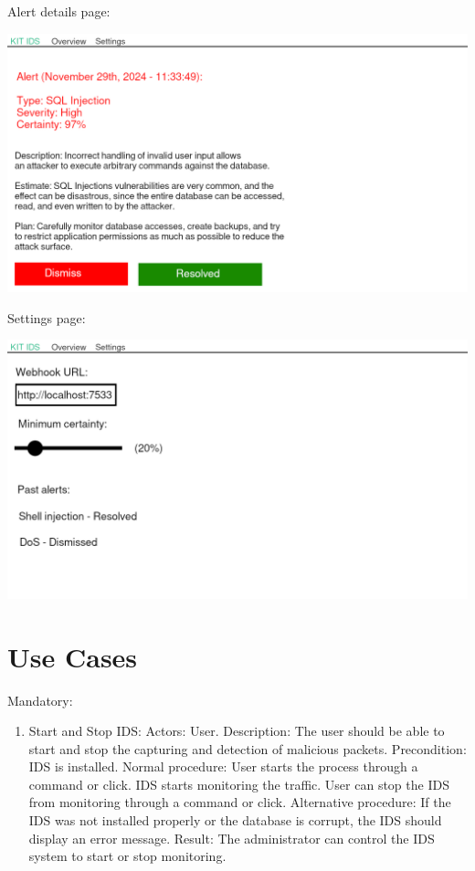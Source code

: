\documentclass[oneside, english]{reports/assets/sdqtechreport}
\begin{document}
Alert details page:

\includegraphics{ui-details}

Settings page:

\includegraphics{ui-settings}

\chapter{Use Cases}
\label{chap:UseCases}

Mandatory:

\begin{enumerate}
	\item Start and Stop IDS: Actors: User. Description: The user should be able to start
	      and stop the capturing and detection of malicious packets. Precondition: IDS is
	      installed. Normal procedure: User starts the process through a command or
	      click. IDS starts monitoring the traffic. User can stop the IDS from monitoring
	      through a command or click. Alternative procedure: If the IDS was not installed
	      properly or the database is corrupt, the IDS should display an error message.
	      Result: The administrator can control the IDS system to start or stop
	      monitoring.
\end{enumerate}
\end{document}

